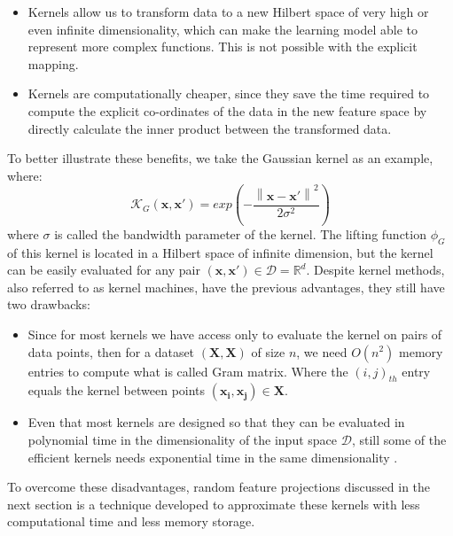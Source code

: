 \begin{itemize}
    \item Kernels allow us to transform data to a new Hilbert space of very high or even infinite dimensionality, which can make the learning model able to represent more complex functions. This is not possible with the explicit mapping.
    \item Kernels are computationally cheaper, since they save the time required to compute the explicit co-ordinates of the data in the new feature space by directly calculate the inner product between the transformed data.
\end{itemize}
To better illustrate these benefits, we take the Gaussian kernel as an example, where:
\begin{equation}
\label{eq:Guassian_kernel}
    \mathcal{K}_{G}(\mathbf{x},\mathbf{x}')=exp(-\frac{\left \| \mathbf{x}-\mathbf{x}'\right\|^2}{2\sigma^2})
\end{equation}
where $\sigma$ is called the bandwidth parameter of the kernel. The lifting function $\phi_G$ of this kernel is located in a Hilbert space of infinite dimension, but the kernel can be easily evaluated for any pair $(\mathbf{x},\mathbf{x}')\in \mathcal{D}=\mathbb{R}^d$.\newline
Despite kernel methods, also referred to as kernel machines, have the previous advantages, they still have two drawbacks:
\begin{itemize}
    \item Since for most kernels we have access only to evaluate the kernel on pairs of data points, then for a dataset $(\mathbf{X},\mathbf{X})$ of size $n$, we need $O(n^2)$ memory entries to compute what is called Gram matrix. Where the $(i,j)_{th}$ entry equals the kernel between points $(\mathbf{x_i,x_j})\in \mathbf{X}$.
    \item Even that most kernels are designed so that they can be evaluated in polynomial time in the dimensionality of the input space $\mathcal{D}$, still some of the efficient kernels needs exponential time in the same dimensionality \citep{graphlet_kernel}.
\end{itemize}
To overcome these disadvantages, random feature projections discussed in the next section is a technique developed to approximate these kernels with less computational time and less memory storage.

